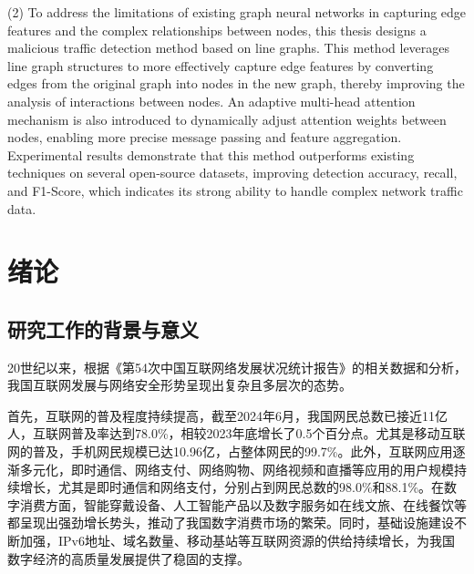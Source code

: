 \documentclass[promaster]{thesis-uestc}
\begin{document}
\begin{englishabstract}
(2) To address the limitations of existing graph neural networks in capturing edge features and the complex relationships between nodes, this thesis designs a malicious traffic detection method based on line graphs. This method leverages line graph structures to more effectively capture edge features by converting edges from the original graph into nodes in the new graph, thereby improving the analysis of interactions between nodes. An adaptive multi-head attention mechanism is also introduced to dynamically adjust attention weights between nodes, enabling more precise message passing and feature aggregation. Experimental results demonstrate that this method outperforms existing techniques on several open-source datasets, improving detection accuracy, recall, and F1-Score, which indicates its strong ability to handle complex network traffic data.



\end{englishabstract}
\thesistableofcontents

\chapter{绪论}

\section{研究工作的背景与意义}
20世纪以来，根据《第54次中国互联网络发展状况统计报告》的相关数据和分析，我国互联网发展与网络安全形势呈现出复杂且多层次的态势。

首先，互联网的普及程度持续提高，截至2024年6月，我国网民总数已接近11亿人，互联网普及率达到78.0\%，相较2023年底增长了0.5个百分点。尤其是移动互联网的普及，手机网民规模已达10.96亿，占整体网民的99.7\%。此外，互联网应用逐渐多元化，即时通信、网络支付、网络购物、网络视频和直播等应用的用户规模持续增长，尤其是即时通信和网络支付，分别占到网民总数的98.0\%和88.1\%。在数字消费方面，智能穿戴设备、人工智能产品以及数字服务如在线文旅、在线餐饮等都呈现出强劲增长势头，推动了我国数字消费市场的繁荣。同时，基础设施建设不断加强，IPv6地址、域名数量、移动基站等互联网资源的供给持续增长，为我国数字经济的高质量发展提供了稳固的支撑。
\end{document}
